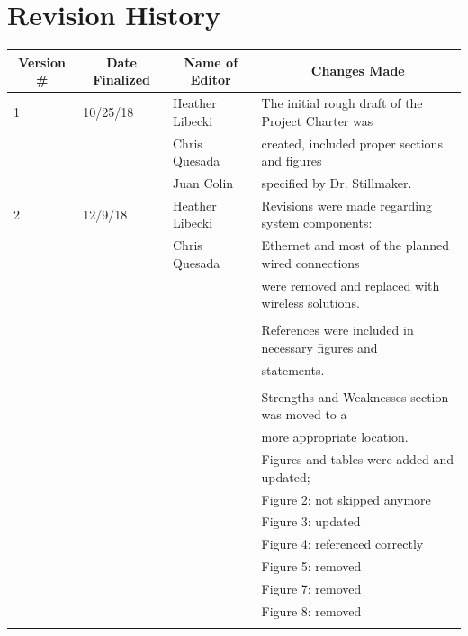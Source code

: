  \section*{Revision History}
\begin{table} [H]	
	\normalsize
	\centering
	\begin{tabular}{|l|l|l|l|}
		\hline
		\multicolumn{1}{|c|}{\textbf{Version \#}} & 
		\multicolumn{1}{|c|}{\textbf{Date Finalized}} &
		\multicolumn{1}{|c|}{\textbf{Name of Editor}} & 
		\multicolumn{1}{|c|}{\textbf{Changes Made}} \\
		\hline
	  1 & 10/25/18 	 & Heather Libecki                 & The initial rough draft of the Project Charter was \\ 
	     &			 & Chris Quesada   		   & created, included proper sections and figures \\ 
	     &			 & Juan Colin     		   & specified by Dr. Stillmaker.\\
		\hline
	   2 & 12/9/18 	 & Heather Libecki  		   & Revisions were made regarding system components:\\ 
	      &			 & Chris Quesada  		   & Ethernet and most of the planned wired connections\\
	      &			 &				   & were removed and replaced with wireless solutions. \\ 
	      &			 &				   & 	\\
	      &			 &				   & References were included in necessary figures and \\
	      &			 &				   & statements. \\
	      &			 &				   & 	\\
	      &			 &				   & Strengths and Weaknesses section was moved to a \\
	      &			 &				   & more appropriate location.\\
	      &			 &				   & Figures and tables were added and updated;\\
	      &			 &				   & Figure 2: not skipped anymore\\
	      &         		 &                			   & Figure 3: updated\\
	      &			 &				   & Figure 4: referenced correctly\\
	      &          		 &                			   & Figure 5: removed\\
	      &			 &				   & Figure 7: removed\\
	      &			 &				   & Figure 8: removed\\
	      &			 &				   &	\\

\end{tabular}
\end{table}
